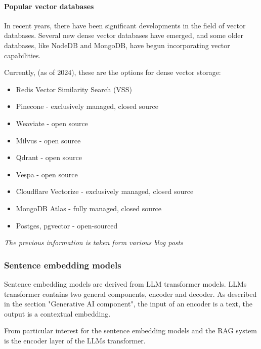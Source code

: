 \documentclass{wseas}
\begin{document}
\paragraph{Popular vector databases}

In recent years, there have been significant developments in the field
of vector databases. Several new dense vector databases have emerged,
and some older databases, like NodeDB and MongoDB, have begun
incorporating vector capabilities.

Currently, (as of 2024), these are the options for dense vector storage:

\begin{itemize}
\item
  Redis Vector Similarity Search (VSS)
\item
  Pinecone - exclusively managed, closed source
\item
  Weaviate - open source
\item
  Milvus - open source
\item
  Qdrant - open source
\item
  Vespa - open source
\item
  Cloudflare Vectorize - exclusively managed, closed source
\item
  MongoDB Atlas - fully managed, closed source
\item
  Postges, pgvector - open-sourced
\end{itemize}

\emph{The previous information is taken form various blog posts} \cite{website_MediumGuideonRAGDatabases} \cite{Website_CloudflareGuideonVectorInsertion}\cite{website_AporiaGuideonVectorDatabasesforRAG} 
\cite{website_DatabricksGlossaryonRAG} \cite{website_MongoDBAtlasCLIDocumentation}\cite{website_MediumGuideonRAGwithAtlas} \cite{website_Neo4jBlogOnLangchainVectorIndex} \cite{website_PondhouseGuideOnAdvancedRAG}

\subsubsection{Sentence embedding models}

Sentence embedding models are derived from LLM transformer models. LLMs
transformer contains two general components, encoder and decoder. As
described in the section "Generative AI component", the input of an encoder is a text, the output is a
contextual embedding.

From particular interest for the sentence embedding models and the RAG
system is the encoder layer of the LLMs transformer.
\end{document}
